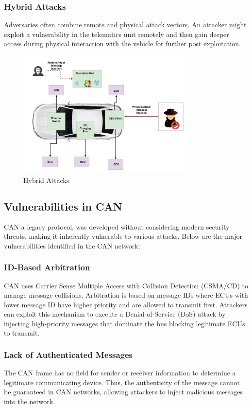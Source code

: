 \documentclass{report}
\begin{document}
\subsubsection{Hybrid Attacks}
Adversaries often combine remote and physical attack vectors.  An attacker might exploit a vulnerability in the telematics unit remotely and then gain deeper access during physical interaction with the vehicle for further post exploitation.
\begin{figure}[h]
    \centering
    \includegraphics[width=0.8\textwidth]{figures/hybrid.jpg}
    \caption{Hybrid Attacks}
    \label{fig:Hybrid Attacks}
\end{figure}

\subsection{Vulnerabilities in CAN}
CAN a legacy protocol, was developed without considering modern security threats, making it inherently vulnerable to various attacks. Below are the major vulnerabilities identified in the CAN network:

\subsubsection{ID-Based Arbitration}
CAN uses Carrier Sense Multiple Access with Collision Detection (CSMA/CD) to manage message collisions. Arbitration is based on message IDs where ECUs with lower message ID have higher priority and are allowed to transmit first. Attackers can exploit this mechanism to execute a Denial-of-Service (DoS) attack by injecting high-priority messages that dominate the bus blocking legitimate ECUs to transmit.

\subsubsection{Lack of Authenticated Messages}
The CAN frame has no field for sender or receiver information to determine a legitimate communicating device. Thus, the authenticity of the message cannot be guaranteed in CAN networks, allowing attackers to inject malicious messages into the network.
\end{document}
